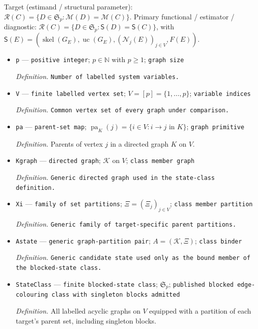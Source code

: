 \documentclass{article}
\begin{document}
Target (estimand / structural parameter): \(\mathcal R(C)=\{D\in\mathfrak S_p:\mathcal M(D)=\mathcal M(C)\}\).
Primary functional / estimator / diagnostic: \(\mathcal R(C)=\{D\in\mathfrak S_p:\mathsf S(D)=\mathsf S(C)\}\), with \(\mathsf S(E)=(\operatorname{skel}(G_E),\operatorname{uc}(G_E),(\mathcal N_j(E))_{j\in V},F(E))\).
\begin{itemize}
  \item \texttt{p} --- \texttt{positive integer}; \(p\in\mathbb N\) with \(p\geq 1\); \texttt{graph size}
  \par\smallskip\noindent\emph{Definition.} \texttt{Number of labelled system variables.}
  \item \texttt{V} --- \texttt{finite labelled vertex set}; \(V=[p]=\{1,\ldots,p\}\); \texttt{variable indices}
  \par\smallskip\noindent\emph{Definition.} \texttt{Common vertex set of every graph under comparison.}
  \item \texttt{pa} --- \texttt{parent-\allowbreak{}set map}; \(\operatorname{pa}_{K}(j)=\{i\in V:i\to j\text{ in }K\}\); \texttt{graph primitive}
  \par\smallskip\noindent\emph{Definition.} Parents of vertex \(j\) in a directed graph \(K\) on \(V\).
  \item \texttt{Kgraph} --- \texttt{directed graph}; \(\mathcal K\) on \(V\); \texttt{class member graph}
  \par\smallskip\noindent\emph{Definition.} \texttt{Generic directed graph used in the state-\allowbreak{}class definition.}
  \item \texttt{Xi} --- \texttt{family of set partitions}; \(\Xi=(\Xi_j)_{j\in V}\); \texttt{class member partition}
  \par\smallskip\noindent\emph{Definition.} \texttt{Generic family of target-\allowbreak{}specific parent partitions.}
  \item \texttt{Astate} --- \texttt{generic graph-\allowbreak{}partition pair}; \(A=(\mathcal K,\Xi)\); \texttt{class binder}
  \par\smallskip\noindent\emph{Definition.} \texttt{Generic candidate state used only as the bound member of the blocked-\allowbreak{}state class.}
  \item \texttt{StateClass} --- \texttt{finite blocked-\allowbreak{}state class}; \(\mathfrak S_p\); \texttt{published blocked edge-\allowbreak{}colouring class with singleton blocks admitted}
  \par\smallskip\noindent\emph{Definition.} All labelled acyclic graphs on \(V\) equipped with a partition of each target's parent set, including singleton blocks.

\end{itemize}
\end{document}
